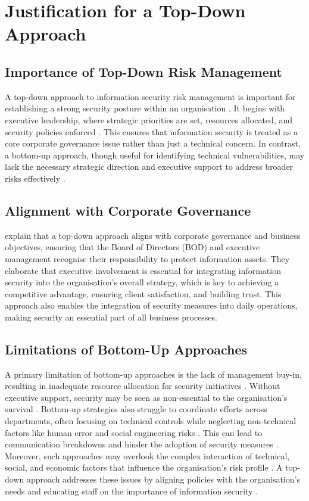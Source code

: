 \section{Justification for a Top-Down Approach}
    \subsection{Importance of Top-Down Risk Management}
    A top-down approach to information security risk management is important for establishing a strong security posture within an organisation \citep{linkov2014risk}. It begins with executive leadership, where strategic priorities are set, resources allocated, and security policies enforced \citep{fazlida2015information}. This ensures that information security is treated as a core corporate governance issue rather than just a technical concern. In contrast, a bottom-up approach, though useful for identifying technical vulnerabilities, may lack the necessary strategic direction and executive support to address broader risks effectively \citep{linkov2014risk}.

    \subsection{Alignment with Corporate Governance}
    \citet{fazlida2015information} explain that a top-down approach aligns with corporate governance and business objectives, ensuring that the Board of Directors (BOD) and executive management recognise their responsibility to protect information assets. They elaborate that executive involvement is essential for integrating information security into the organisation's overall strategy, which is key to achieving a competitive advantage, ensuring client satisfaction, and building trust. This approach also enables the integration of security measures into daily operations, making security an essential part of all business processes.

    \subsection{Limitations of Bottom-Up Approaches}
    A primary limitation of bottom-up approaches is the lack of management buy-in, resulting in inadequate resource allocation for security initiatives \citep{fazlida2015information}. Without executive support, security may be seen as non-essential to the organisation's survival \citep{fazlida2015information}. Bottom-up strategies also struggle to coordinate efforts across departments, often focusing on technical controls while neglecting non-technical factors like human error and social engineering risks \citep{shedden2010information}. This can lead to communication breakdowns and hinder the adoption of security measures \citep{shaikh2023information}. Moreover, such approaches may overlook the complex interaction of technical, social, and economic factors that influence the organisation's risk profile \citep{cai2017cybersecurity}. A top-down approach addresses these issues by aligning policies with the organisation's needs and educating staff on the importance of information security \citep{shaikh2023information}.

